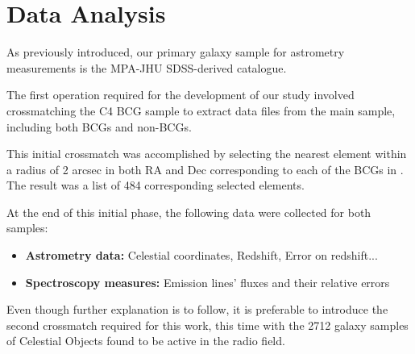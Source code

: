 \newpage
\section{Data Analysis}
As previously introduced, our primary galaxy sample for astrometry measurements is the MPA-JHU SDSS-derived catalogue.

The first operation required for the development of our study involved crossmatching the C4 BCG sample \cite{2009yCat..73790867V} to extract data files from the main sample, including both BCGs and non-BCGs.

This initial crossmatch was accomplished by selecting the nearest element within a radius of 2 arcsec in both RA and Dec corresponding to each of the BCGs in \cite{2009yCat..73790867V}. The result was a list of 484 corresponding selected elements.

At the end of this initial phase, the following data were collected for both samples:
\begin{itemize}
    \item \textbf{Astrometry data:} Celestial coordinates, Redshift, Error on redshift...
    \item \textbf{Spectroscopy measures:} Emission lines' fluxes and their relative errors
\end{itemize}

Even though further explanation is to follow, it is preferable to introduce the second crossmatch required for this work, this time with the 2712 galaxy samples of Celestial Objects found to be active in the radio field.

